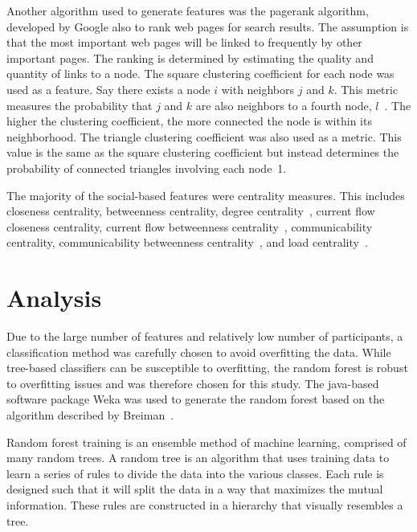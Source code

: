 \documentclass[10pt,twocolumn,conference]{IEEEtran}
\begin{document}
Another algorithm used to generate features was the pagerank algorithm, developed by Google 
\cite{page_pagerank_1999} also to rank web pages for search results.
The assumption is that the most important web pages will be linked to frequently by other important pages.
The ranking is determined by estimating the quality and quantity of links to a node.
The square clustering coefficient for each node was used as a feature.
Say there exists a node $i$ with neighbors $j$ and $k$.
This metric measures the probability that $j$ and $k$ are also neighbors to a fourth node, $l$~\cite{lind_cycles_2005}.
The higher the clustering coefficient, the more connected the node is within its neighborhood.
The triangle clustering coefficient was also used as a metric.
This value is the same as the square clustering coefficient but instead determines the probability of connected triangles involving each node~\cite{saramaki_generalizations_2007}1.

The majority of the social-based features were centrality measures.
This includes closeness centrality, betweenness centrality, degree centrality~\cite{borgatti2011analyzing}, current flow closeness centrality, current flow betweenness centrality~\cite{brandes2005centrality}, communicability centrality, communicability betweenness centrality~\cite{estrada2008communicability}, and load centrality~\cite{newman2001scientific}.

\section{Analysis} \label{Analysis}

Due to the large number of features and relatively low number of participants, a classification method was carefully chosen to avoid overfitting the data.
While tree-based classifiers can be susceptible to overfitting, the random forest is robust to overfitting issues and was therefore chosen for this study.
The java-based software package Weka was used to generate the random forest based on the algorithm described by Breiman~\cite{Breiman2001}.

Random forest training is an ensemble method of machine learning, comprised of many random trees.
A random tree is an algorithm that uses training data to learn a series of rules to divide the data into the various classes.
Each rule is designed such that it will split the data in a way that maximizes the mutual information.
These rules are constructed in a hierarchy that visually resembles a tree.
\end{document}
